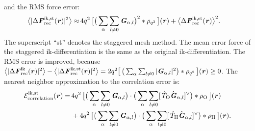 \documentclass[journal=jacsat,manuscript=article]{achemso}
\renewcommand{\v}[1]{\textbf{\textit{#1}}}
\begin{document}
and the RMS force error:
\begin{align}\label{eqn:ik.st.error}
  \big\langle
  \vert\Delta\v F_{\textrm{rec}}^{\textrm{ik,st}}(\v r)\vert^2
  \big\rangle
  \approx&\,
  4q^2\,
  \big[
  \big(
  \sum_{\alpha} \sum_{l\neq 0}  
  \v G_{\alpha,l}
  \big)^2
  \ast \rho_{q^2}\,
  \big] (\v r) +
  \big\langle
  \Delta\v F_{\textrm{rec}}^{\textrm{ik,st}}(\v r)
  \big\rangle^2.
\end{align}
The superscript ``st'' denotes the staggered mesh method.
The mean error force of the staggered ik-differentiation is the
same as the original ik-differentiation.
The RMS error is improved, because
$\big\langle\vert\Delta\v F_{\textrm{rec}}^{\textrm{ik}}(\v r)\vert^2\big\rangle -
\big\langle\vert\Delta\v F_{\textrm{rec}}^{\textrm{ik,st}}(\v r)\vert^2\big\rangle=
2q^2
\big[\,
\big(
\sum_{\alpha} \sum_{l\neq 0}
\vert \v G_{\alpha,l}\vert^2
\big)
\ast \rho_{q^2}
\,\big] (\v r) \geq 0$.
The nearest neighbor approximation to the correlation error is:
\begin{align}\nonumber
  \mathcal E^{\textrm{ik,st}}_{\textrm{correlation}}(\v r)
  =\,&
  4q^2\,
  \big[
  \big(
  \sum_{\alpha} \sum_{l\neq 0}  
  \v G_{\alpha,l}
  \big)
  \cdot
  \big(
  \sum_{\alpha} \sum_{l\neq 0}  
  [\,\hat T_{\textrm{O}}\hat{\v G}_{\alpha,l}]^{\vee}
  \big)
  \ast \rho_{\textrm{O}}\,
  \big] (\v r) \\\nonumber
  \,&+
  4q^2\,
  \big[
  \big(
  \sum_{\alpha} \sum_{l\neq 0}  
  \v G_{\alpha,l}
  \big)
  \cdot
  \big(
  \sum_{\alpha} \sum_{l\neq 0}  
  [\,\hat T_{\textrm{H}}\hat{\v G}_{\alpha,l}]^{\vee}
  \big)
  \ast \rho_{\textrm{H}}\,
  \big] (\v r).
\end{align}
\end{document}
